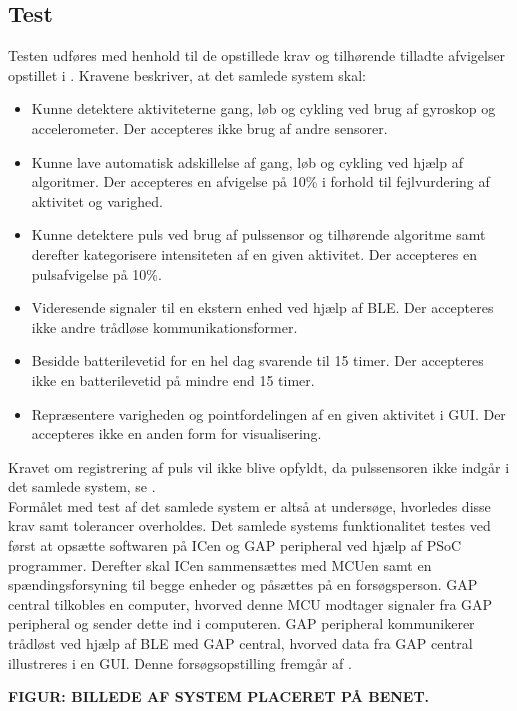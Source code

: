 \subsection{Test}
Testen udføres med henhold til de opstillede krav og tilhørende tilladte afvigelser opstillet i . Kravene beskriver, at det samlede system skal:
\begin{itemize}
	\item Kunne detektere aktiviteterne gang, løb og cykling ved brug af gyroskop og accelerometer. Der accepteres ikke brug af andre sensorer.
	\item Kunne lave automatisk adskillelse af gang, løb og cykling ved hjælp af algoritmer. Der accepteres en afvigelse på 10\% i forhold til fejlvurdering af aktivitet og varighed.
	\item Kunne detektere puls ved brug af pulssensor og tilhørende algoritme samt derefter kategorisere intensiteten af en given aktivitet. Der accepteres en pulsafvigelse på 10\%.
	\item Videresende signaler til en ekstern enhed ved hjælp af BLE. Der accepteres ikke andre trådløse kommunikationsformer.
	\item Besidde batterilevetid for en hel dag svarende til 15 timer. Der accepteres ikke en batterilevetid på mindre end 15 timer.
	\item Repræsentere varigheden og pointfordelingen af en given aktivitet i GUI. Der accepteres ikke en anden form for visualisering. 
\end{itemize}
Kravet om registrering af puls vil ikke blive opfyldt, da pulssensoren ikke indgår i det samlede system, se . \\
Formålet med test af det samlede system er altså at undersøge, hvorledes disse krav samt tolerancer overholdes. Det samlede systems funktionalitet testes ved først at opsætte softwaren på ICen og GAP peripheral ved hjælp af PSoC programmer. Derefter skal ICen sammensættes med MCUen samt en spændingsforsyning til begge enheder og påsættes på en forsøgsperson. GAP central tilkobles en computer, hvorved denne MCU modtager signaler fra GAP peripheral og sender dette ind i computeren. GAP peripheral kommunikerer trådløst ved hjælp af BLE med GAP central, hvorved data fra GAP central illustreres i en GUI. Denne forsøgsopstilling fremgår af .

\textbf{FIGUR: BILLEDE AF SYSTEM PLACERET PÅ BENET.} \\

